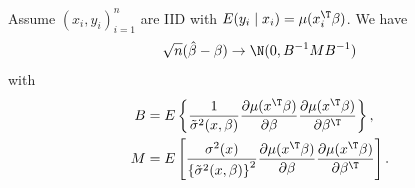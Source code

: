  
 \begin{theorem}
 \label{theorem::glm-sandwich}
Assume $(x_i,y_i)_{i=1}^n$ are IID with $E(y_i \mid x_i) = \mu(x_{i}^{\T}\beta)$. We have
$$
\sqrt{n} (\hat{\beta}-\beta )\rightarrow\N(0,B^{-1}MB^{-1})
$$
with
\begin{align}
B & =E\left\{ \frac{1}{\tilde{\sigma}^{2}(x, \beta)}\frac{\partial\mu(x^{\T}\beta)}{\partial\beta}\frac{\partial\mu(x^{\T}\beta)}{\partial\beta^{\T}}\right\} , \label{eq::sandwich-var-b}\\
M & =E\left[\frac{\sigma^{2}(x)}{\left\{ \tilde{\sigma}^{2}(x,  \beta)\right\} ^{2}}\frac{\partial\mu(x^{\T}\beta)}{\partial\beta}\frac{\partial\mu(x^{\T}\beta)}{\partial\beta^{\T}}\right]. \label{eq::sandwich-var-m}
\end{align}
\end{theorem}  
 
